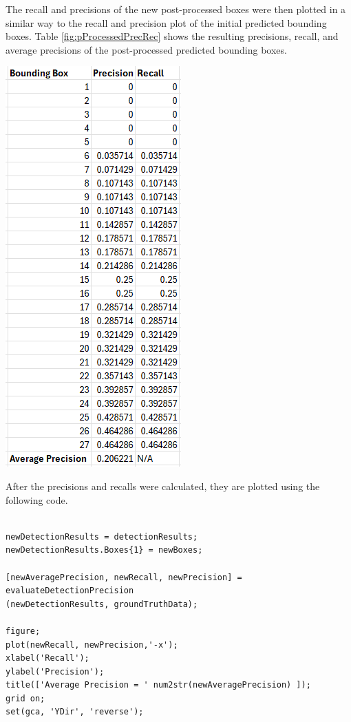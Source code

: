 \documentclass[man]{apa7}
\begin{document}
The recall and precisions of the new post-processed boxes were then plotted in a similar way to the recall and precision plot of the initial predicted bounding boxes. Table \ref{fig:pProcessedPrecRec} shows the resulting precisions, recall, and average precisions of the post-processed predicted bounding boxes.

\newpage

\begin{minipage}{\linewidth}
  \includegraphics[]{figures/finalPrecRec.png}
  \label{fig:pProcessedPrecRec}
\end{minipage}

After the precisions and recalls were calculated, they are plotted using the following code.

\newpage

\begin{lstlisting}[]

newDetectionResults = detectionResults;
newDetectionResults.Boxes{1} = newBoxes;

[newAveragePrecision, newRecall, newPrecision] = evaluateDetectionPrecision
(newDetectionResults, groundTruthData);

figure;
plot(newRecall, newPrecision,'-x');
xlabel('Recall');
ylabel('Precision');
title(['Average Precision = ' num2str(newAveragePrecision) ]);
grid on;
set(gca, 'YDir', 'reverse');

\end{lstlisting}
\end{document}
